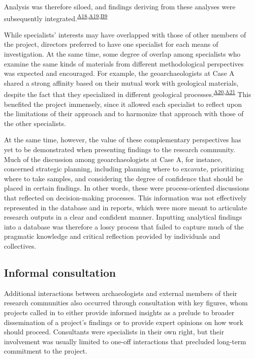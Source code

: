 \documentclass[
  canadian,
]{article}
\begin{document}
Analysis was therefore siloed, and findings deriving from these analyses
were subsequently
integrated.\textsuperscript{\hyperref[sec-A18]{A18},\hyperref[sec-A19]{A19},\hyperref[sec-B9]{B9}}

While specialists' interests may have overlapped with those of other
members of the project, directors preferred to have one specialist for
each means of investigation. At the same time, some degree of overlap
among specialists who examine the same kinds of materials from different
methodological perspectives was expected and encouraged. For example,
the geoarchaeologists at Case A shared a strong affinity based on their
mutual work with geological materials, despite the fact that they
specialized in different geological
processes.\textsuperscript{\hyperref[sec-A20]{A20},\hyperref[sec-A21]{A21}}
This benefited the project immensely, since it allowed each specialist
to reflect upon the limitations of their approach and to harmonize that
approach with those of the other specialists.

At the same time, however, the value of these complementary perspectives
has yet to be demonstrated when presenting findings to the research
community. Much of the discussion among geoarchaeologists at Case A, for
instance, concerned strategic planning, including planning where to
excavate, prioritizing where to take samples, and considering the degree
of confidence that should be placed in certain findings. In other words,
these were process-oriented discussions that reflected on
decision-making processes. This information was not effectively
represented in the database and in reports, which were more meant to
articulate research outputs in a clear and confident manner. Inputting
analytical findings into a database was therefore a lossy process that
failed to capture much of the pragmatic knowledge and critical
reflection provided by individuals and collectives.

\subsection{Informal consultation}\label{informal-consultation}

Additional interactions between archaeologists and external members of
their research communities also occurred through consultation with key
figures, whom projects called in to either provide informed insights as
a prelude to broader dissemination of a project's findings or to provide
expert opinions on how work should proceed. Consultants were specialists
in their own right, but their involvement was usually limited to one-off
interactions that precluded long-term commitment to the project.
\end{document}
